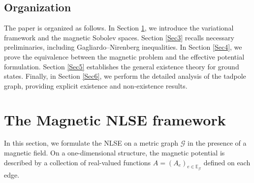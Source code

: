 \documentclass[12pt,a4paper]{amsart}
\theoremstyle{definition}
\theoremstyle{plain}
\numberwithin{equation}{section}
\begin{document}
\subsection*{Organization}
The paper is organized as follows. In Section \ref{Sec2}, we introduce the variational framework and the magnetic Sobolev spaces. Section \ref{Sec3} recalls necessary preliminaries, including Gagliardo--Nirenberg inequalities. In Section \ref{Sec4}, we prove the equivalence between the magnetic problem and the effective potential formulation. Section \ref{Sec5} establishes the general existence theory for ground states. Finally, in Section \ref{Sec6}, we perform the detailed analysis of the tadpole graph, providing explicit existence and non-existence results.

\section{The Magnetic NLSE framework}
\label{Sec2}

In this section, we formulate the NLSE on a metric graph $\mathcal{G}$ in the presence of a magnetic field. 
On a one-dimensional structure, the magnetic potential is described by a collection of real-valued functions $A = (A_e)_{e \in \mathbb{E}_\mathcal{G}}$ defined on each edge.
\end{document}
